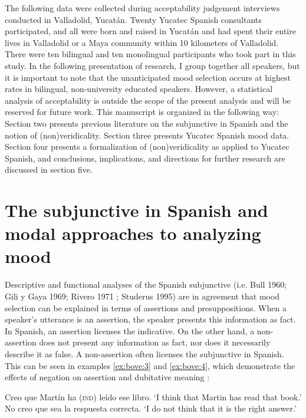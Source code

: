 \documentclass[output=paper,colorlinks,citecolor=brown,
]{langscibook}
\begin{document}
The following data were collected during acceptability judgement interviews conducted in Valladolid, Yucatán. Twenty Yucatec Spanish consultants participated, and all were born and raised in Yucatán and had spent their entire lives in Valladolid or a Maya community within 10 kilometers of Valladolid. There were ten bilingual and ten monolingual participants who took part in this study. In the following presentation of research, I group together all speakers, but it is important to note that the unanticipated mood selection occurs at highest rates in bilingual, non-university educated speakers. However, a statistical analysis of acceptability is outside the scope of the present analysis and will be reserved for future work. This manuscript is organized in the following way: Section two presents previous literature on the subjunctive in Spanish and the notion of (non)veridicality. Section three presents Yucatec Spanish mood data. Section four presents a formalization of (non)veridicality as applied to Yucatec Spanish, and conclusions, implications, and directions for further research are discussed in section five.
 
\section{The subjunctive in Spanish and modal approaches to analyzing mood}

Descriptive and functional analyses of the Spanish subjunctive (i.e. Bull 1960; Gili y Gaya 1969; Rivero 1971  \citealt{TerrellHooper1974,GarciaTracey1997,Bell1980,Lunn1989,Lunn1995}; Studerus 1995) are in agreement that mood selection can be explained in terms of assertions and presuppositions. When a speaker's utterance is an assertion, the speaker presents this information as fact. In Spanish, an assertion licenses the indicative. On the other hand, a non-assertion does not present any information as fact, nor does it necessarily describe it as false. A non-assertion often licenses the subjunctive in Spanish. This can be seen in examples \ref{ex:bove:3} and \ref{ex:bove:4}, which demonstrate the effects of negation on assertion and dubitative meaning \citep[490]{TerrellHooper1974}:


\begin{exe} %
    \ex\label{ex:bove:3} 
    \begin{xlist} %
        \ex \label{ex:bove:3a}
           Creo que Martín ha (\textsc{ind}) leído ese libro.   %
                   \glt `I think that Martin has read that book.'
        \ex\label{ex:bove:3b}
           No creo que sea la respuesta correcta.
                   \glt `I do not think that it is the right answer.'
\end{xlist}
\end{exe}
\end{document}
